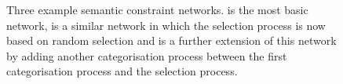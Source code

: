 \begin{figure}
\centering
{}
\caption[Three example semantic constraint networks]{Three example semantic
  constraint networks.  is the most basic network,
   is a similar network in which the
  selection process is now based on random selection and
   is a further extension of this network by
  adding another categorisation process between the first
  categorisation process and the selection process.}
\label{f:map-networks}
\end{figure}


